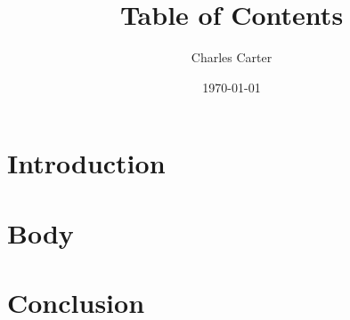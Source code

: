 \documentclass{article}
\title{Table of Contents}
\author{Charles Carter}
\date{\today{}}
\begin{document}
 
    \maketitle{}
    \tableofcontents{}
    \section{Introduction}
    \label{Introduction}
        \lipsum[1]{}
    \section{Body}
    \label{Body}
        \lipsum[2-4]{}
    \section{Conclusion}
    \label{Conclusion}
        \lipsum[5]{}
\end{document}
